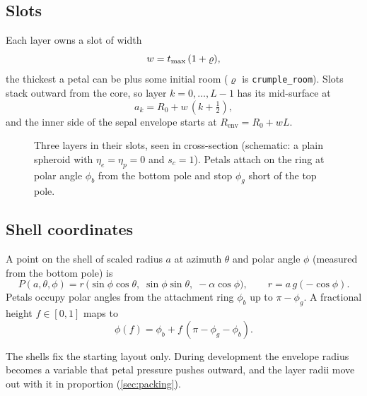 \subsection{Slots}
Each layer owns a slot of width
\[
  w = t_{\max}\,(1 + \varrho),
\]
the thickest a petal can be plus some initial room ($\varrho$ is \texttt{crumple\_room}). Slots stack outward from the
core, so layer $k = 0,\dots,L-1$ has its mid-surface at
\[
  a_k = R_0 + w\,(k + \tfrac12),
\]
and the inner side of the sepal envelope starts at $R_{\mathrm{env}} = R_0 + wL$.

\begin{figure}[ht]
\centering
{}
\caption{Three layers in their slots, seen in cross-section (schematic: a
plain spheroid with $\eta_e=\eta_p=0$ and $s_c=1$). Petals attach on
the ring at polar angle $\phi_b$ from the bottom pole and stop $\phi_g$ short of
the top pole.}
\label{fig:shells}
\end{figure}

\subsection{Shell coordinates}
A point on the shell of scaled radius $a$ at azimuth $\theta$ and polar angle
$\phi$ (measured from the bottom pole) is
\[
  P(a,\theta,\phi) = r\,\bigl(\sin\phi\cos\theta,\; \sin\phi\sin\theta,\; -\alpha\cos\phi\bigr),
  \qquad r = a\,g(-\cos\phi).
\]
Petals occupy polar angles from the attachment ring $\phi_b$ up to
$\pi - \phi_g$. A fractional height $f\in[0,1]$ maps to
\[
  \phi(f) = \phi_b + f\,(\pi - \phi_g - \phi_b).
\]

\begin{remark}
The shells fix the starting layout only. During development the envelope
radius becomes a variable that petal pressure pushes outward, and the layer
radii move out with it in proportion (\cref{sec:packing}).
\end{remark}
